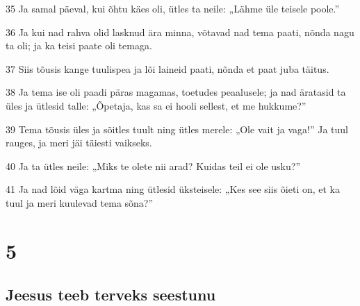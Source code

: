 \par 35 Ja samal päeval, kui õhtu käes oli, ütles ta neile: „Lähme üle teisele poole.”
\par 36 Ja kui nad rahva olid lasknud ära minna, võtavad nad tema paati, nõnda nagu ta oli; ja ka teisi paate oli temaga.
\par 37 Siis tõusis kange tuulispea ja lõi laineid paati, nõnda et paat juba täitus.
\par 38 Ja tema ise oli paadi päras magamas, toetudes peaalusele; ja nad äratasid ta üles ja ütlesid talle: „Õpetaja, kas sa ei hooli sellest, et me hukkume?”
\par 39 Tema tõusis üles ja sõitles tuult ning ütles merele: „Ole vait ja vaga!” Ja tuul rauges, ja meri jäi täiesti vaikseks.
\par 40 Ja ta ütles neile: „Miks te olete nii arad? Kuidas teil ei ole usku?”
\par 41 Ja nad lõid väga kartma ning ütlesid üksteisele: „Kes see siis õieti on, et ka tuul ja meri kuulevad tema sõna?”


\chapter{5}

\section*{Jeesus teeb terveks seestunu}

